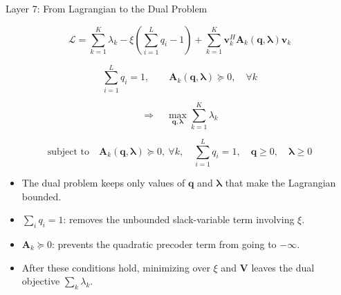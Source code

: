 \documentclass{beamer}
\begin{document}
\begin{frame}{Layer 7: From Lagrangian to the Dual Problem}
\scriptsize

\[
\mathcal{L}
=
\sum_{k=1}^{K}\lambda_k
-
\xi\left(\sum_{i=1}^{L}q_i-1\right)
+
\sum_{k=1}^{K}
\mathbf{v}_k^H
\mathbf{A}_k(\mathbf{q},\boldsymbol{\lambda})
\mathbf{v}_k
\]

\[
\sum_{i=1}^{L}q_i=1,
\qquad
\mathbf{A}_k(\mathbf{q},\boldsymbol{\lambda})\succeq0,
\quad \forall k
\]

\[
\Longrightarrow
\quad
\max_{\mathbf{q},\boldsymbol{\lambda}}
\sum_{k=1}^{K}\lambda_k
\]

\[
\text{subject to}
\quad
\mathbf{A}_k(\mathbf{q},\boldsymbol{\lambda})\succeq0,\ \forall k,
\quad
\sum_{i=1}^{L}q_i=1,
\quad
\mathbf{q}\ge0,
\quad
\boldsymbol{\lambda}\ge0
\]

\begin{itemize}
    \item The dual problem keeps only values of \(\mathbf{q}\) and \(\boldsymbol{\lambda}\) that make the Lagrangian bounded.
    \item \(\sum_i q_i=1\): removes the unbounded slack-variable term involving \(\xi\).
    \item \(\mathbf{A}_k\succeq0\): prevents the quadratic precoder term from going to \(-\infty\).
    \item After these conditions hold, minimizing over \(\xi\) and \(\mathbf{V}\) leaves the dual objective \(\sum_k\lambda_k\).
\end{itemize}

\end{frame}
\end{document}
